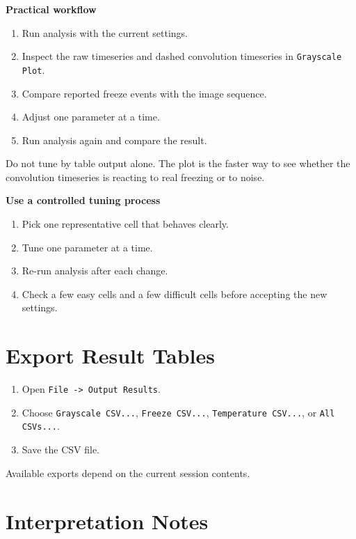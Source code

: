 \documentclass[
  9pt,
  letterpaper,
  oneside,
  open=any,
  DIV=15,
  parskip=half-,
  headings=big,
  numbers=noenddot
]{scrbook}
\newcommand{\manuallead}[1]{%
  \vspace{0.15em}%
  {\sffamily\bfseries\color{ManualBlue}#1}\par\nobreak\vspace{0.05em}%
}
\begin{document}
\manuallead{Practical workflow}

\begin{enumerate}[leftmargin=*,itemsep=0.35em,topsep=0.4em]
\item Run analysis with the current settings.
\item Inspect the raw timeseries and dashed convolution timeseries in \texttt{Grayscale Plot}.
\item Compare reported freeze events with the image sequence.
\item Adjust one parameter at a time.
\item Run analysis again and compare the result.
\end{enumerate}

Do not tune by table output alone. The plot is the faster way to see whether the convolution timeseries is reacting to real freezing or to noise.


\manuallead{Use a controlled tuning process}

\begin{enumerate}[leftmargin=*,itemsep=0.35em,topsep=0.4em]
\item Pick one representative cell that behaves clearly.
\item Tune one parameter at a time.
\item Re-run analysis after each change.
\item Check a few easy cells and a few difficult cells before accepting the new settings.
\end{enumerate}

\section{Export Result Tables}

\begin{enumerate}[leftmargin=*,itemsep=0.35em,topsep=0.4em]
\item Open \texttt{File -> Output Results}.
\item Choose \texttt{Grayscale CSV...}, \texttt{Freeze CSV...}, \texttt{Temperature CSV...}, or \texttt{All CSVs...}.
\item Save the CSV file.
\end{enumerate}

Available exports depend on the current session contents.


\section{Interpretation Notes}
\end{document}
